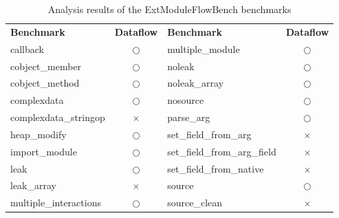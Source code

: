 \begin{table*}[t]
  \vspace{2mm}
  \caption{Analysis results of the ExtModuleFlowBench benchmarks}
  \label{table:RQ1-3}
  \vspace*{-1em}
  \centering
  \small
\renewcommand{\arraystretch}{.9}
  \begin{tabular}{@{}l|c||l|c@{}}
    \textbf{Benchmark} & \textbf{Dataflow} & \textbf{Benchmark} & \textbf{Dataflow} \\\hhline{=|=#=|=}
    callback                    & $\bigcirc$  & multiple\_module             & $\bigcirc$  \\
    cobject\_member             & $\bigcirc$  & noleak                       & $\bigcirc$  \\
    cobject\_method             & $\bigcirc$  & noleak\_array                & $\bigcirc$  \\
    complexdata                 & $\bigcirc$  & nosource                     & $\bigcirc$  \\
    complexdata\_stringop       & $\times$    & parse\_arg                   & $\bigcirc$  \\
    heap\_modify                & $\bigcirc$  & set\_field\_from\_arg        & $\times$    \\
    import\_module              & $\bigcirc$  & set\_field\_from\_arg\_field & $\times$    \\
    leak                        & $\bigcirc$  & set\_field\_from\_native     & $\times$    \\
    leak\_array                 & $\times$    & source                       & $\bigcirc$  \\
    multiple\_interactions      & $\bigcirc$  & source\_clean                & $\times$
  \end{tabular}
\end{table*}
